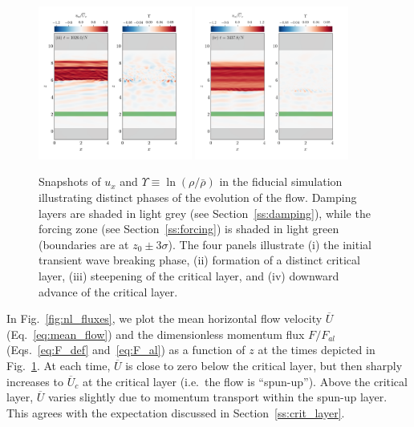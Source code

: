 \documentclass[
        fleqn,
        usenatbib,
    ]{mnras}
\newcommand*{\p}[1]{\left(#1\right)}
\begin{document}
\begin{figure}
    \includegraphics[width=0.45\textwidth]{plots/yubo_000134_labeled.png}\hfil
    \includegraphics[width=0.45\textwidth]{plots/yubo_000451_labeled.png}
    \caption{Snapshots of $u_x$ and $\Upsilon \equiv \ln \p{\rho / \bar{\rho}}$
    in the fiducial simulation illustrating distinct phases of the evolution of
    the flow. Damping layers are shaded in light grey (see
    Section~\ref{ss:damping}), while the forcing zone (see
    Section~\ref{ss:forcing}) is shaded in light green (boundaries are at $z_0
    \pm 3\sigma$). The four panels illustrate (i) the initial transient wave
    breaking phase, (ii) formation of a distinct critical layer, (iii)
    steepening of the critical layer, and (iv) downward advance of the critical
    layer.}\label{fig:snapshots}
\end{figure}

In Fig.~\ref{fig:nl_fluxes}, we plot the mean horizontal flow velocity
$\overline{U}$ (Eq.~\eqref{eq:mean_flow}) and the dimensionless momentum flux $F
/ F_{al}$ (Eqs.~\eqref{eq:F_def} and~\eqref{eq:F_al}) as a function of $z$ at
the times depicted in Fig.~\ref{fig:snapshots}. At each time, $\overline{U}$ is
close to zero below the critical layer, but then sharply increases to
$\overline{U}_c$ at the critical layer (i.e.\ the flow is ``spun-up''). Above
the critical layer, $\overline{U}$ varies slightly due to momentum transport
within the spun-up layer. This agrees with the expectation discussed in
Section~\ref{ss:crit_layer}.
\end{document}
